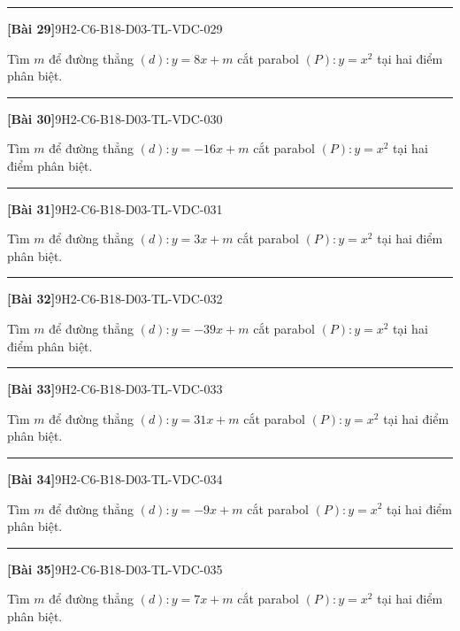 \documentclass[12pt,a4paper]{article}
\newif\ifloigiai
\newenvironment{cauhoi}[2]{%
  \par\medskip\noindent\rule{\textwidth}{0.4pt}\par\nopagebreak
  \noindent\textbf{[#1]}\hfill{\scriptsize\ttfamily #2}\par\nopagebreak\smallskip}{\par}
\newcommand{\loigiai}[1]{\ifloigiai\par\smallskip\noindent\textit{Lời giải.} #1\par\fi}
\begin{document}
\begin{cauhoi}{Bài 29}{9H2-C6-B18-D03-TL-VDC-029}
Tìm $m$ để đường thẳng $(d): y=8x+m$ cắt parabol $(P): y=x^{2}$ tại hai điểm phân biệt.
\loigiai{Phương trình hoành độ giao điểm $x^{2}-8x-m=0$. Để $(d)$ cắt $(P)$ tại hai điểm phân biệt cần $\Delta=64+4m>0$, suy ra $m>-16$.}
\end{cauhoi}
\begin{cauhoi}{Bài 30}{9H2-C6-B18-D03-TL-VDC-030}
Tìm $m$ để đường thẳng $(d): y=-16x+m$ cắt parabol $(P): y=x^{2}$ tại hai điểm phân biệt.
\loigiai{Phương trình hoành độ giao điểm $x^{2}+16x-m=0$. Để $(d)$ cắt $(P)$ tại hai điểm phân biệt cần $\Delta=256+4m>0$, suy ra $m>-64$.}
\end{cauhoi}
\begin{cauhoi}{Bài 31}{9H2-C6-B18-D03-TL-VDC-031}
Tìm $m$ để đường thẳng $(d): y=3x+m$ cắt parabol $(P): y=x^{2}$ tại hai điểm phân biệt.
\loigiai{Phương trình hoành độ giao điểm $x^{2}-3x-m=0$. Để $(d)$ cắt $(P)$ tại hai điểm phân biệt cần $\Delta=9+4m>0$, suy ra $m>-\dfrac{9}{4}$.}
\end{cauhoi}
\begin{cauhoi}{Bài 32}{9H2-C6-B18-D03-TL-VDC-032}
Tìm $m$ để đường thẳng $(d): y=-39x+m$ cắt parabol $(P): y=x^{2}$ tại hai điểm phân biệt.
\loigiai{Phương trình hoành độ giao điểm $x^{2}+39x-m=0$. Để $(d)$ cắt $(P)$ tại hai điểm phân biệt cần $\Delta=1521+4m>0$, suy ra $m>-\dfrac{1521}{4}$.}
\end{cauhoi}
\begin{cauhoi}{Bài 33}{9H2-C6-B18-D03-TL-VDC-033}
Tìm $m$ để đường thẳng $(d): y=31x+m$ cắt parabol $(P): y=x^{2}$ tại hai điểm phân biệt.
\loigiai{Phương trình hoành độ giao điểm $x^{2}-31x-m=0$. Để $(d)$ cắt $(P)$ tại hai điểm phân biệt cần $\Delta=961+4m>0$, suy ra $m>-\dfrac{961}{4}$.}
\end{cauhoi}
\begin{cauhoi}{Bài 34}{9H2-C6-B18-D03-TL-VDC-034}
Tìm $m$ để đường thẳng $(d): y=-9x+m$ cắt parabol $(P): y=x^{2}$ tại hai điểm phân biệt.
\loigiai{Phương trình hoành độ giao điểm $x^{2}+9x-m=0$. Để $(d)$ cắt $(P)$ tại hai điểm phân biệt cần $\Delta=81+4m>0$, suy ra $m>-\dfrac{81}{4}$.}
\end{cauhoi}
\begin{cauhoi}{Bài 35}{9H2-C6-B18-D03-TL-VDC-035}
Tìm $m$ để đường thẳng $(d): y=7x+m$ cắt parabol $(P): y=x^{2}$ tại hai điểm phân biệt.
\loigiai{Phương trình hoành độ giao điểm $x^{2}-7x-m=0$. Để $(d)$ cắt $(P)$ tại hai điểm phân biệt cần $\Delta=49+4m>0$, suy ra $m>-\dfrac{49}{4}$.}
\end{cauhoi}
\end{document}
